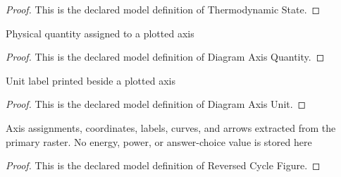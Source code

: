 \begin{proof}
  This is the declared model definition of Thermodynamic State.
\end{proof}
\begin{definition}
  \label{def:physics:phyx-mini-0431:phyxminiproblems-problemphyxmini0431-diagramaxisquantity}
  Physical quantity assigned to a plotted axis
\end{definition}
\begin{proof}
  This is the declared model definition of Diagram Axis Quantity.
\end{proof}
\begin{definition}
  \label{def:physics:phyx-mini-0431:phyxminiproblems-problemphyxmini0431-diagramaxisunit}
  Unit label printed beside a plotted axis
\end{definition}
\begin{proof}
  This is the declared model definition of Diagram Axis Unit.
\end{proof}
\begin{definition}
  \label{def:physics:phyx-mini-0431:phyxminiproblems-problemphyxmini0431-reversedcyclefigure}
  Axis assignments, coordinates, labels, curves, and arrows extracted from the primary raster. No energy, power, or answer-choice value is stored here
\end{definition}
\begin{proof}
  This is the declared model definition of Reversed Cycle Figure.
\end{proof}
